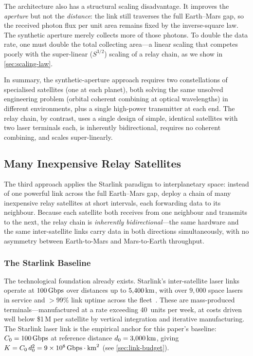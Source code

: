 The architecture also has a structural scaling disadvantage. It improves the
\emph{aperture} but not the \emph{distance}: the link still traverses the full
Earth--Mars gap, so the received photon flux per unit area remains fixed by the
inverse-square law. The synthetic aperture merely collects more of those photons.
To double the data rate, one must double the total collecting area---a linear
scaling that competes poorly with the super-linear ($S^{3/2}$) scaling of a
relay chain, as we show in \cref{sec:scaling-law}.

In summary, the synthetic-aperture approach requires two constellations of
specialised satellites (one at each planet), both solving the same unsolved
engineering problem (orbital coherent combining at optical wavelengths) in
different environments, plus a single high-power transmitter at each end.
The relay chain, by contrast, uses a single design of simple, identical
satellites with two laser terminals each, is inherently bidirectional, requires
no coherent combining, and scales super-linearly.


\subsection{Many Inexpensive Relay Satellites}
\label{sec:many-sats}

The third approach applies the Starlink paradigm to interplanetary space:
instead of one powerful link across the full Earth--Mars gap, deploy a chain of
many inexpensive relay satellites at short intervals, each forwarding data to
its neighbour. Because each satellite both receives from one neighbour and
transmits to the next, the relay chain is \emph{inherently bidirectional}---the
same hardware and the same inter-satellite links carry data in both directions
simultaneously, with no asymmetry between Earth-to-Mars and Mars-to-Earth
throughput.

\subsubsection{The Starlink Baseline}

The technological foundation already exists. Starlink's inter-satellite laser
links operate at $100\,\text{Gbps}$ over distances up to $5{,}400\,\text{km}$, with over
$9{,}000$ space lasers in service and $> 99\%$ link uptime across the
fleet~\cite{starlink2024}. These are mass-produced terminals---manufactured at a rate
exceeding 40~units per week, at costs driven well below \$1\,M per satellite by
vertical integration and iterative manufacturing. The Starlink laser link is
the empirical anchor for this paper's baseline: $C_0 = 100\,\text{Gbps}$ at reference
distance $d_0 = 3{,}000\,\text{km}$, giving
$K = C_0 \, d_0^2 = 9 \times 10^{8}\,\text{Gbps}\cdot\text{km}^2$ (see
\cref{sec:link-budget}).

